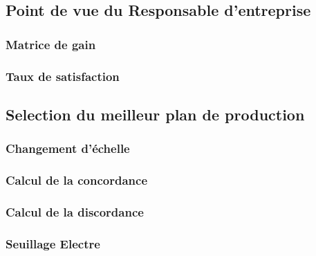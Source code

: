 \documentclass[12pt]{article}
\begin{document}
\subsection{Point de vue du Responsable d'entreprise}
\subsubsection{Matrice de gain}

\subsubsection{Taux de satisfaction}

\subsection{Selection du meilleur plan de production}
\subsubsection{Changement d'échelle}

\subsubsection{Calcul de la concordance}

\subsubsection{Calcul de la discordance}

\subsubsection{Seuillage Electre}

\end{document}
